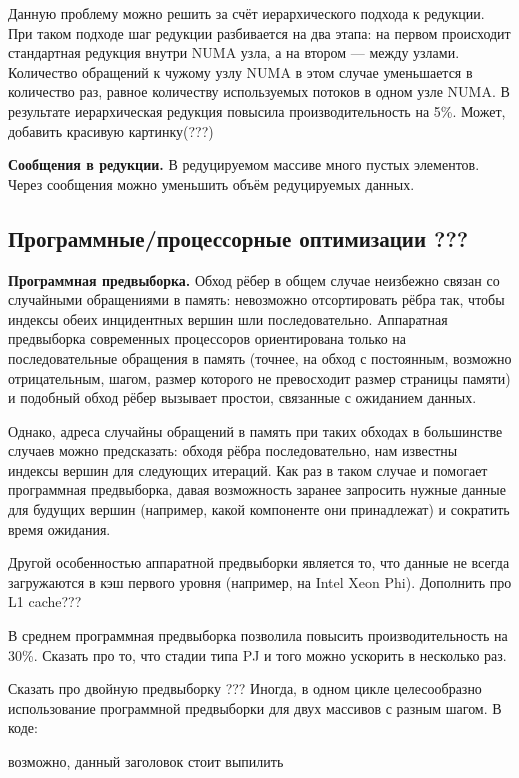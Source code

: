 \documentclass{article}
\begin{document}
Данную проблему можно решить за счёт иерархического подхода к редукции. При таком подходе шаг редукции разбивается на два этапа: на первом происходит стандартная редукция внутри NUMA узла, а на втором  --- между узлами. Количество обращений к чужому узлу NUMA в этом случае уменьшается в количество раз, равное количеству используемых потоков в одном узле NUMA. В результате иерархическая редукция повысила производительность на 5\%.
Может, добавить красивую картинку(???)

\textbf{Сообщения в редукции.}
В редуцируемом массиве много пустых элементов. Через сообщения можно уменьшить объём редуцируемых данных.

\subsection{Программные/процессорные оптимизации ???}

\textbf{Программная предвыборка.}
Обход рёбер в общем случае неизбежно связан со случайными обращениями в память: невозможно отсортировать рёбра так, чтобы индексы обеих инцидентных вершин шли последовательно.
Аппаратная предвыборка современных процессоров ориентирована только на последовательные обращения в память (точнее, на обход с постоянным, возможно отрицательным, шагом, размер которого не превосходит размер страницы памяти) и подобный обход рёбер вызывает простои, связанные с ожиданием данных.

Однако, адреса случайны обращений в память при таких обходах в большинстве случаев можно предсказать: обходя рёбра последовательно, нам известны индексы вершин для следующих итераций. Как раз в таком случае и помогает программная предвыборка, давая возможность заранее запросить нужные данные для будущих вершин (например, какой компоненте они принадлежат) и сократить время ожидания.

Другой особенностью аппаратной предвыборки является то, что данные не всегда загружаются в кэш первого уровня (например, на Intel Xeon Phi). Дополнить про L1 cache???

В среднем программная предвыборка позволила повысить производительность на 30\%. Сказать про то, что стадии типа PJ и того можно ускорить в несколько раз.

Сказать про двойную предвыборку ???
Иногда, в одном цикле целесообразно использование программной предвыборки для двух массивов с разным шагом. В коде:
\begin{algorithm}
    \SetAlgoLined
    \caption{возможно, данный заголовок стоит выпилить}
\end{algorithm}
\end{document}
